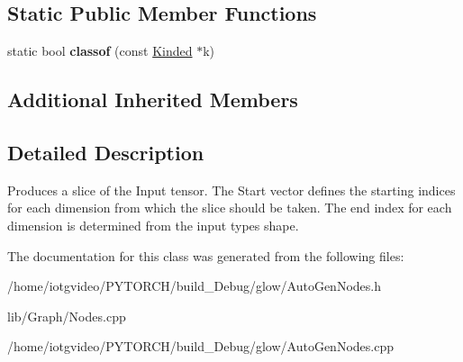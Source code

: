 \subsection*{Static Public Member Functions}
\begin{DoxyCompactItemize}
\item 
\mbox{\label{classglow_1_1_slice_node_ae95724aaaa37bba40b9ed4b8ab190061}} 
static bool {\bfseries classof} (const \hyperlink{classglow_1_1_kinded}{Kinded} $\ast$k)
\end{DoxyCompactItemize}
\subsection*{Additional Inherited Members}


\subsection{Detailed Description}
Produces a slice of the Input tensor. The Start vector defines the starting indices for each dimension from which the slice should be taken. The end index for each dimension is determined from the input type\textquotesingle{}s shape. 

The documentation for this class was generated from the following files\+:\begin{DoxyCompactItemize}
\item 
/home/iotgvideo/\+P\+Y\+T\+O\+R\+C\+H/build\+\_\+\+Debug/glow/Auto\+Gen\+Nodes.\+h\item 
lib/\+Graph/Nodes.\+cpp\item 
/home/iotgvideo/\+P\+Y\+T\+O\+R\+C\+H/build\+\_\+\+Debug/glow/Auto\+Gen\+Nodes.\+cpp\end{DoxyCompactItemize}
